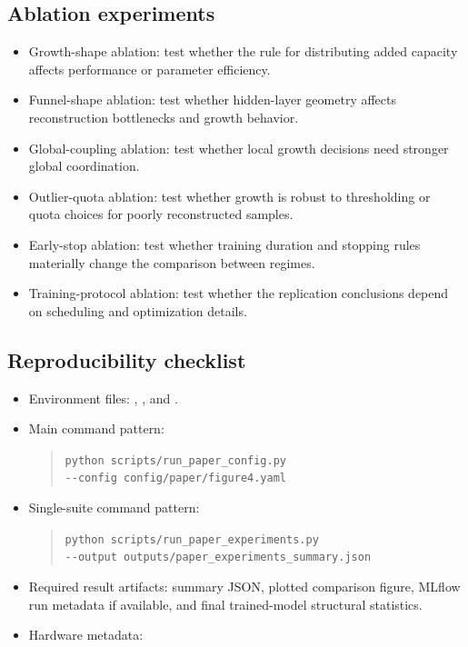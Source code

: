 \subsection{Ablation experiments}
\begin{itemize}
  \item Growth-shape ablation: test whether the rule for distributing added capacity affects performance or parameter efficiency.
  \item Funnel-shape ablation: test whether hidden-layer geometry affects reconstruction bottlenecks and growth behavior.
  \item Global-coupling ablation: test whether local growth decisions need stronger global coordination.
  \item Outlier-quota ablation: test whether growth is robust to thresholding or quota choices for poorly reconstructed samples.
  \item Early-stop ablation: test whether training duration and stopping rules materially change the comparison between regimes.
  \item Training-protocol ablation: test whether the replication conclusions depend on scheduling and optimization details.
\end{itemize}

\subsection{Reproducibility checklist}
\begin{itemize}
  \item Environment files: , , and .
  \item Main command pattern:
    \begin{quote}
      \small\texttt{python scripts/run\_paper\_config.py}\\
      \small\texttt{-{}-config config/paper/figure4.yaml}
    \end{quote}
  \item Single-suite command pattern:
    \begin{quote}
      \small\texttt{python scripts/run\_paper\_experiments.py}\\
      \small\texttt{-{}-output outputs/paper\_experiments\_summary.json}
    \end{quote}
  \item Required result artifacts: summary JSON, plotted comparison figure, MLflow run metadata if available, and final trained-model structural statistics.
  \item Hardware metadata: 
\end{itemize}
